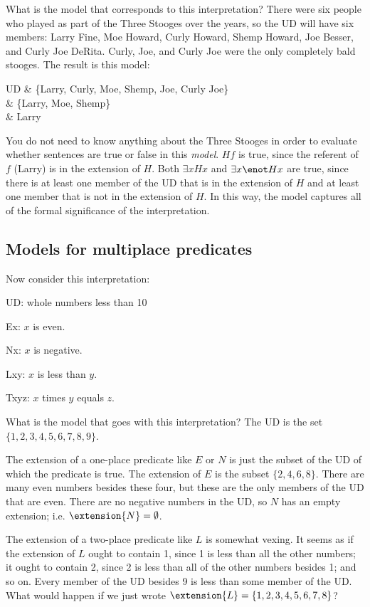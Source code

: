 What is the model that corresponds to this interpretation? There were six people who played as part of the Three Stooges over the years, so the UD will have six members: Larry Fine, Moe Howard, Curly Howard, Shemp Howard, Joe Besser, and Curly Joe DeRita. Curly, Joe, and Curly Joe were the only completely bald stooges. The result is this model:
\begin{partialmodel}
	UD & \{Larry, Curly, Moe, Shemp, Joe, Curly Joe\}\\
	 & \{Larry, Moe, Shemp\}\\
	 & Larry
\end{partialmodel}

You do not need to know anything about the Three Stooges in order to evaluate whether sentences are true or false in this \emph{model}. $Hf$ is true, since the referent of $f$ (Larry) is in the extension of $H$. Both $\exists x Hx$ and $\exists x \enot Hx$ are true, since there is at least one member of the UD that is in the extension of $H$ and at least one member that is not in the extension of $H$. In this way, the model captures all of the formal significance of the interpretation.

\subsection{Models for multiplace predicates}

Now consider this interpretation:
\begin{ekey}
\item{UD:} whole numbers less than 10
\item{Ex:} $x$ is even.
\item{Nx:} $x$ is negative.
\item{Lxy:} $x$ is less than $y$.
\item{Txyz:} $x$ times $y$ equals $z$.
\end{ekey}
What is the model that goes with this interpretation?
The UD is the set $\{1,2,3,4,5,6,7,8,9\}$.

The extension of a one-place predicate like $E$ or $N$ is just the subset of the UD of which the predicate is true. The extension of $E$ is the subset $\{2,4,6,8\}$. There are many even numbers besides these four, but these are the only members of the UD that are even. There are no negative numbers in the UD, so $N$ has an empty extension; i.e. $\extension{N}=\emptyset$.

The extension of a two-place predicate like $L$ is somewhat vexing. It seems as if the extension of $L$ ought to contain 1, since 1 is less than all the other numbers; it ought to contain 2, since 2 is less than all of the other numbers besides 1; and so on. Every member of the UD besides 9 is less than some member of the UD. What would happen if we just wrote $\extension{L}=\{1,2,3,4,5,6,7,8\}$?

